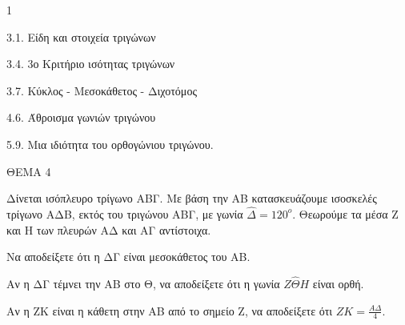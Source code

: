 \begin{ylh}{1}
    \item 3.1. Είδη και στοιχεία τριγώνων
    \item 3.4. 3ο Κριτήριο ισότητας τριγώνων
    \item 3.7. Κύκλος - Μεσοκάθετος - Διχοτόμος
    \item 4.6. Άθροισμα γωνιών τριγώνου
    \item 5.9. Μια ιδιότητα του ορθογώνιου τριγώνου.
\end{ylh}

ΘΕΜΑ 4

Δίνεται ισόπλευρο τρίγωνο ΑΒΓ. Με βάση την ΑΒ κατασκευάζουμε ισοσκελές τρίγωνο ΑΔΒ, εκτός του τριγώνου ΑΒΓ, με γωνία $\widehat{\Delta} = 120^{ο}$. Θεωρούμε τα μέσα Ζ και Η των πλευρών ΑΔ και ΑΓ αντίστοιχα.

\begin{alist}
\item Να αποδείξετε ότι η ΔΓ είναι μεσοκάθετος του ΑΒ. 

\item Αν η ΔΓ τέμνει την ΑΒ στο Θ, να αποδείξετε ότι η γωνία $Ζ\widehat{\Theta}Η$ είναι ορθή. 

\item Αν η ΖΚ είναι η κάθετη στην ΑΒ από το σημείο Ζ, να αποδείξετε ότι $ΖΚ = \frac{Α\Delta}{4}$. 


\end{alist}

